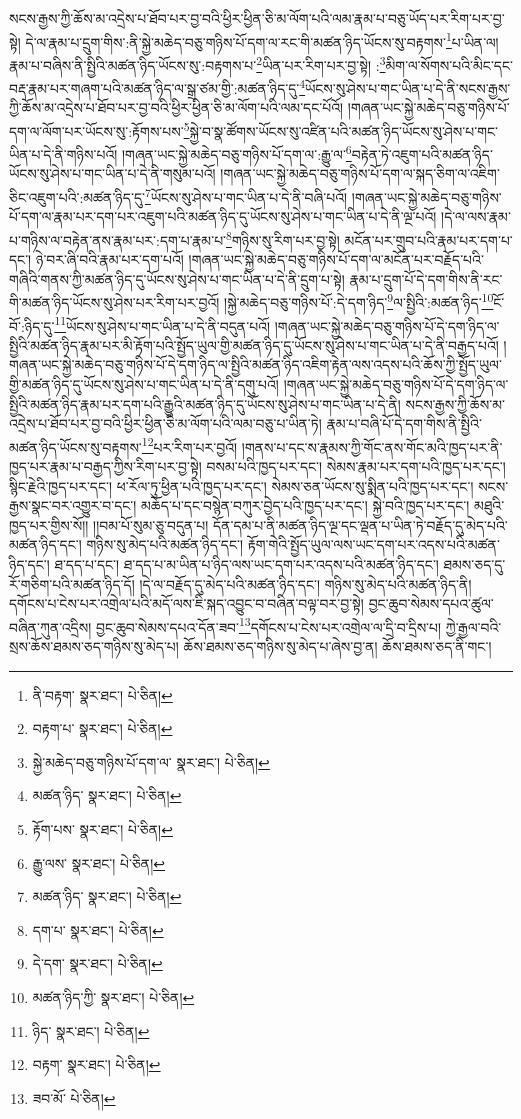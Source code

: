 སངས་རྒྱས་ཀྱི་ཆོས་མ་འདྲེས་པ་ཐོབ་པར་བྱ་བའི་ཕྱིར་ཕྱིན་ཅི་མ་ལོག་པའི་ལམ་རྣམ་པ་བཅུ་ཡོད་པར་རིག་པར་བྱ་སྟེ། དེ་ལ་རྣམ་པ་དྲུག་གིས་:ནི་སྐྱེ་མཆེད་བཅུ་གཉིས་པོ་དག་ལ་རང་གི་མཚན་ཉིད་ཡོངས་སུ་བརྟགས་\footnote{ནི་བརྟག་  སྣར་ཐང་།  པེ་ཅིན། }པ་ཡིན་ལ། རྣམ་པ་བཞིས་ནི་སྤྱིའི་མཚན་ཉིད་ཡོངས་སུ་:བརྟགས་པ་\footnote{བརྟག་པ་  སྣར་ཐང་།  པེ་ཅིན། }ཡིན་པར་རིག་པར་བྱ་སྟེ། :\footnote{སྐྱེ་མཆེད་བཅུ་གཉིས་པོ་དག་ལ་  སྣར་ཐང་།  པེ་ཅིན། }མིག་ལ་སོགས་པའི་མིང་དང་བརྡ་རྣམ་པར་གཞག་པའི་མཚན་ཉིད་ལ་སྒྲ་ཙམ་གྱི་:མཚན་ཉིད་དུ་\footnote{མཚན་ཉིད་  སྣར་ཐང་།  པེ་ཅིན། }ཡོངས་སུ་ཤེས་པ་གང་ཡིན་པ་དེ་ནི་སངས་རྒྱས་ཀྱི་ཆོས་མ་འདྲེས་པ་ཐོབ་པར་བྱ་བའི་ཕྱིར་ཕྱིན་ཅི་མ་ལོག་པའི་ལམ་དང་པོའོ། །གཞན་ཡང་སྐྱེ་མཆེད་བཅུ་གཉིས་པོ་དག་ལ་ལོག་པར་ཡོངས་སུ་:རྟོགས་པས་\footnote{རྟོག་པས་  སྣར་ཐང་།  པེ་ཅིན། }སྐྱེ་བ་སྣ་ཚོགས་ཡོངས་སུ་འཛིན་པའི་མཚན་ཉིད་ཡོངས་སུ་ཤེས་པ་གང་ཡིན་པ་དེ་ནི་གཉིས་པའོ། །གཞན་ཡང་སྐྱེ་མཆེད་བཅུ་གཉིས་པོ་དག་ལ་:རྒྱུ་ལ་\footnote{རྒྱུ་ལས་  སྣར་ཐང་།  པེ་ཅིན། }བརྟེན་ཏེ་འཇུག་པའི་མཚན་ཉིད་ཡོངས་སུ་ཤེས་པ་གང་ཡིན་པ་དེ་ནི་གསུམ་པའོ། །གཞན་ཡང་སྐྱེ་མཆེད་བཅུ་གཉིས་པོ་དག་ལ་སྐད་ཅིག་ལ་འཇིག་ཅིང་འཇུག་པའི་:མཚན་ཉིད་དུ་\footnote{མཚན་ཉིད་  སྣར་ཐང་།  པེ་ཅིན། }ཡོངས་སུ་ཤེས་པ་གང་ཡིན་པ་དེ་ནི་བཞི་པའོ། །གཞན་ཡང་སྐྱེ་མཆེད་བཅུ་གཉིས་པོ་དག་ལ་རྣམ་པར་དག་པར་འཇུག་པའི་མཚན་ཉིད་དུ་ཡོངས་སུ་ཤེས་པ་གང་ཡིན་པ་དེ་ནི་ལྔ་པའོ། །དེ་ལ་ལས་རྣམ་པ་གཉིས་ལ་བརྟེན་ནས་རྣམ་པར་:དག་པ་རྣམ་པ་\footnote{དག་པ་  སྣར་ཐང་།  པེ་ཅིན། }གཉིས་སུ་རིག་པར་བྱ་སྟེ། མངོན་པར་གྲུབ་པའི་རྣམ་པར་དག་པ་དང་། ཉེ་བར་ཞི་བའི་རྣམ་པར་དག་པའོ། །གཞན་ཡང་སྐྱེ་མཆེད་བཅུ་གཉིས་པོ་དག་ལ་མངོན་པར་བརྗོད་པའི་གཞིའི་གནས་ཀྱི་མཚན་ཉིད་དུ་ཡོངས་སུ་ཤེས་པ་གང་ཡིན་པ་དེ་ནི་དྲུག་པ་སྟེ། རྣམ་པ་དྲུག་པོ་དེ་དག་གིས་ནི་རང་གི་མཚན་ཉིད་ཡོངས་སུ་ཤེས་པར་རིག་པར་བྱའོ། །སྐྱེ་མཆེད་བཅུ་གཉིས་པོ་:དེ་དག་ཉིད་\footnote{དེ་དག་  སྣར་ཐང་།  པེ་ཅིན། }ལ་སྤྱིའི་:མཚན་ཉིད་\footnote{མཚན་ཉིད་ཀྱི་  སྣར་ཐང་།  པེ་ཅིན། }ངོ་བོ་:ཉིད་དུ་\footnote{ཉིད་  སྣར་ཐང་།  པེ་ཅིན། }ཡོངས་སུ་ཤེས་པ་གང་ཡིན་པ་དེ་ནི་བདུན་པའོ། །གཞན་ཡང་སྐྱེ་མཆེད་བཅུ་གཉིས་པོ་དེ་དག་ཉིད་ལ་སྤྱིའི་མཚན་ཉིད་རྣམ་པར་མི་རྟོག་པའི་སྤྱོད་ཡུལ་གྱི་མཚན་ཉིད་དུ་ཡོངས་སུ་ཤེས་པ་གང་ཡིན་པ་དེ་ནི་བརྒྱད་པའོ། །གཞན་ཡང་སྐྱེ་མཆེད་བཅུ་གཉིས་པོ་དེ་དག་ཉིད་ལ་སྤྱིའི་མཚན་ཉིད་འཇིག་རྟེན་ལས་འདས་པའི་ཆོས་ཀྱི་སྤྱོད་ཡུལ་གྱི་མཚན་ཉིད་དུ་ཡོངས་སུ་ཤེས་པ་གང་ཡིན་པ་དེ་ནི་དགུ་པའོ། །གཞན་ཡང་སྐྱེ་མཆེད་བཅུ་གཉིས་པོ་དེ་དག་ཉིད་ལ་སྤྱིའི་མཚན་ཉིད་རྣམ་པར་དག་པའི་རྒྱུའི་མཚན་ཉིད་དུ་ཡོངས་སུ་ཤེས་པ་གང་ཡིན་པ་དེ་ནི། སངས་རྒྱས་ཀྱི་ཆོས་མ་འདྲེས་པ་ཐོབ་པར་བྱ་བའི་ཕྱིར་ཕྱིན་ཅི་མ་ལོག་པའི་ལམ་བཅུ་པ་ཡིན་ཏེ། རྣམ་པ་བཞི་པོ་དེ་དག་གིས་ནི་སྤྱིའི་མཚན་ཉིད་ཡོངས་སུ་བརྟགས་\footnote{བརྟག་  སྣར་ཐང་།  པེ་ཅིན། }པར་རིག་པར་བྱའོ། །གནས་པ་དང་ས་རྣམས་ཀྱི་གོང་ནས་གོང་མའི་ཁྱད་པར་ནི་ཁྱད་པར་རྣམ་པ་བརྒྱད་ཀྱིས་རིག་པར་བྱ་སྟེ། བསམ་པའི་ཁྱད་པར་དང་། སེམས་རྣམ་པར་དག་པའི་ཁྱད་པར་དང་། སྙིང་རྗེའི་ཁྱད་པར་དང་། ཕ་རོལ་ཏུ་ཕྱིན་པའི་ཁྱད་པར་དང་། སེམས་ཅན་ཡོངས་སུ་སྨིན་པའི་ཁྱད་པར་དང་། སངས་རྒྱས་སྣང་བར་འགྱུར་བ་དང་། མཆོད་པ་དང་བསྙེན་བཀུར་བྱེད་པའི་ཁྱད་པར་དང་། སྐྱེ་བའི་ཁྱད་པར་དང་། མཐུའི་ཁྱད་པར་གྱིས་སོ།། །།བམ་པོ་སུམ་ཅུ་བདུན་པ། དོན་དམ་པ་ནི་མཚན་ཉིད་ལྔ་དང་ལྡན་པ་ཡིན་ཏེ་བརྗོད་དུ་མེད་པའི་མཚན་ཉིད་དང་། གཉིས་སུ་མེད་པའི་མཚན་ཉིད་དང་། རྟོག་གེའི་སྤྱོད་ཡུལ་ལས་ཡང་དག་པར་འདས་པའི་མཚན་ཉིད་དང་། ཐ་དད་པ་དང་། ཐ་དད་པ་མ་ཡིན་པ་ཉིད་ལས་ཡང་དག་པར་འདས་པའི་མཚན་ཉིད་དང་། ཐམས་ཅད་དུ་རོ་གཅིག་པའི་མཚན་ཉིད་དོ། །དེ་ལ་བརྗོད་དུ་མེད་པའི་མཚན་ཉིད་དང་། གཉིས་སུ་མེད་པའི་མཚན་ཉིད་ནི། དགོངས་པ་ངེས་པར་འགྲེལ་པའི་མདོ་ལས་ཇི་སྐད་འབྱུང་བ་བཞིན་བལྟ་བར་བྱ་སྟེ། བྱང་ཆུབ་སེམས་དཔའ་ཚུལ་བཞིན་ཀུན་འདྲིས། བྱང་ཆུབ་སེམས་དཔའ་དོན་ཟབ་\footnote{ཟབ་མོ་  པེ་ཅིན། }དགོངས་པ་ངེས་པར་འགྲེལ་ལ་དྲི་བ་དྲིས་པ། ཀྱེ་རྒྱལ་བའི་སྲས་ཆོས་ཐམས་ཅད་གཉིས་སུ་མེད་པ། ཆོས་ཐམས་ཅད་གཉིས་སུ་མེད་པ་ཞེས་བྱ་ན། ཆོས་ཐམས་ཅད་ནི་གང་། 
